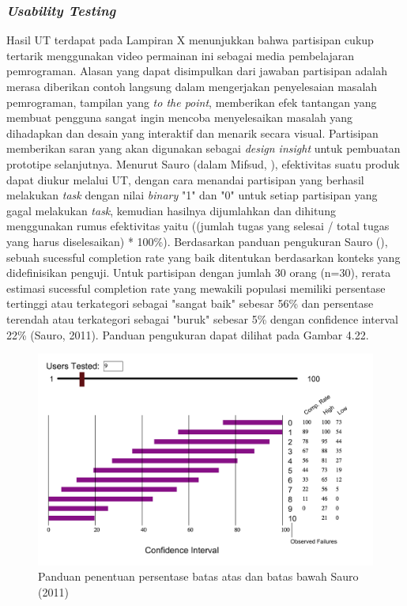 	\subsubsection{\textit{Usability Testing}}
	Hasil UT terdapat pada Lampiran X menunjukkan bahwa partisipan cukup tertarik menggunakan video permainan ini sebagai media pembelajaran pemrograman. Alasan yang dapat disimpulkan dari jawaban partisipan adalah merasa diberikan contoh langsung dalam mengerjakan penyelesaian masalah pemrograman, tampilan yang \textit{to the point}, memberikan efek tantangan yang membuat pengguna sangat ingin mencoba menyelesaikan masalah yang dihadapkan dan desain yang interaktif dan menarik secara visual. Partisipan memberikan saran yang akan digunakan sebagai \textit{design insight} untuk pembuatan prototipe selanjutnya.
	\linebreak\linebreak
	Menurut Sauro (dalam Mifsud, \citeyear{article.sauroMifsud}), efektivitas suatu produk dapat diukur melalui UT, dengan cara menandai partisipan yang berhasil melakukan \textit{task} dengan nilai \textit{binary} "1" dan "0" untuk setiap partisipan yang gagal melakukan \textit{task}, kemudian hasilnya dijumlahkan dan dihitung menggunakan rumus efektivitas yaitu ((jumlah tugas yang selesai / total tugas yang harus diselesaikan) * 100\%).
	\linebreak\linebreak
	Berdasarkan panduan pengukuran Sauro (\citeyear{article.sauroWhat}), sebuah sucessful completion
	rate yang baik ditentukan berdasarkan konteks yang didefinisikan penguji. Untuk
	partisipan dengan jumlah 30 orang (n=30), rerata estimasi sucessful completion rate
	yang mewakili populasi memiliki persentase tertinggi atau terkategori sebagai "sangat baik" sebesar 56\% dan persentase terendah atau terkategori sebagai "buruk" sebesar 5\% dengan confidence interval 22\% (Sauro, 2011). Panduan pengukuran dapat dilihat pada Gambar 4.22.
	\begin{figure}
		\centering
		\includegraphics[width=\linewidth]{pics/hasil-sauro}
		\caption{Panduan penentuan persentase batas atas dan batas bawah Sauro (2011)}
	\end{figure}
